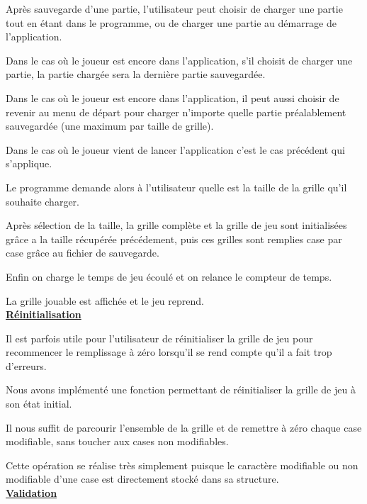 \documentclass[a4paper, 12pt]{article}
\begin{document}
	\par Après sauvegarde d'une partie, l'utilisateur peut choisir de charger une partie tout en étant dans le programme, ou de charger une partie au démarrage de l'application.
	\par Dans le cas où le joueur est encore dans l'application, s'il choisit de charger une partie, la partie chargée sera la dernière partie sauvegardée.
	\par Dans le cas où le joueur est encore dans l'application, il peut aussi choisir de revenir au menu de départ pour charger n'importe quelle partie préalablement sauvegardée (une maximum par taille de grille).
	\par Dans le cas où le joueur vient de lancer l'application c'est le cas précédent qui s'applique.
	\par Le programme demande alors à l'utilisateur quelle est la taille de la grille qu'il souhaite charger.
	\par Après sélection de la taille, la grille complète et la grille de jeu sont initialisées grâce a la taille récupérée précédement, puis ces grilles sont remplies case par case grâce au fichier de sauvegarde.
	\par Enfin on charge le temps de jeu écoulé et on relance le compteur de temps.
	\par La grille jouable est affichée et le jeu reprend.\\

\underline{\textbf{Réinitialisation}}

	\par Il est parfois utile pour l'utilisateur de réinitialiser la grille de jeu pour recommencer le remplissage à zéro lorsqu'il se rend compte qu'il a fait trop d'erreurs.
	\par Nous avons implémenté une fonction permettant de réinitialiser la grille de jeu à son état initial.
	\par Il nous suffit de parcourir l'ensemble de la grille et de remettre à zéro chaque case modifiable, sans toucher aux cases non modifiables.
	\par Cette opération se réalise très simplement puisque le caractère modifiable ou non modifiable d'une case est directement stocké dans sa structure.\\

\underline{\textbf{Validation}}
\end{document}
